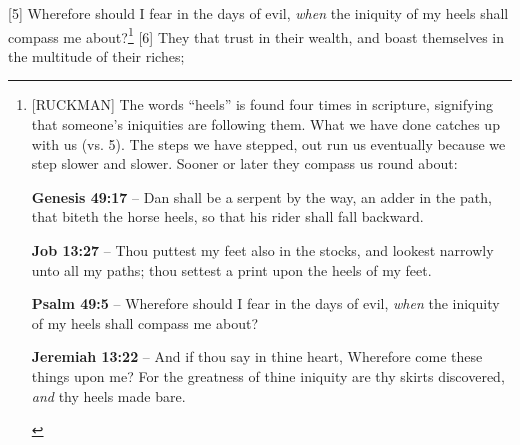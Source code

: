 [5] \textcolor[rgb]{0.00,0.00,1.00}{Wherefore should I fear in the days of evil, \emph{when} the iniquity of my heels shall compass me about?}\footnote{[RUCKMAN] The words ``heels'' is found four times in scripture, signifying that someone’s iniquities are following them. What we have done catches up with us (vs. 5). The steps we have stepped, out run us eventually because we step slower and slower. Sooner or later they compass us round about: \cite{Ruckman1992Psalms}
\begin{compactenum}
\item \textbf{Genesis 49:17} -- Dan shall be a serpent by the way, an adder in the path, that biteth the horse heels, so that his rider shall fall backward.
\item \textbf{Job 13:27} -- Thou puttest my feet also in the stocks, and lookest narrowly unto all my paths; thou settest a print upon the heels of my feet.
\item \textbf{Psalm 49:5} -- Wherefore should I fear in the days of evil, \emph{when} the iniquity of my heels shall compass me about?
\item \textbf{Jeremiah 13:22} -- And if thou say in thine heart, Wherefore come these things upon me? For the greatness of thine iniquity are thy skirts discovered, \emph{and} thy heels made bare.
\end{compactenum} 
}
[6] \textcolor[rgb]{0.00,0.00,1.00}{They that trust in their wealth, and boast themselves in the multitude of their riches;}
